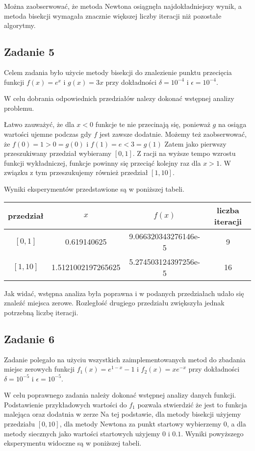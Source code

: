 \documentclass{article}
\begin{document}
Można zaobserwować, że metoda Newtona osiągnęła najdokładniejszy wynik, a metoda bisekcji wymagała znacznie większej liczby iteracji niż pozostałe algorytmy.

\subsection{Zadanie 5}

Celem zadania było użycie metody bisekcji do znalezienie punktu przecięcia funkcji $f(x) = e^x$ i $g(x) = 3x$ przy dokładności $\delta = 10^{-4}$ i $\epsilon = 10^{-4}$.

W celu dobrania odpowiednich przedziałów nalezy dokonać wstępnej analizy problemu.

Łatwo zauważyć, że dla $x < 0$ funkcje te nie przecinają się, ponieważ $g$ na osiąga wartości ujemne podczas gdy $f$ jest zawsze dodatnie.
Możemy też zaobserwować, że $f(0) = 1 > 0 = g(0)$ i $f(1) = e < 3 = g(1)$
Zatem jako pierwszy przeszukiwany przedział wybieramy $[0,1]$.
Z racji na wyższe tempo wzrostu funkcji wykładniczej, funkcje powinny się przeciąć kolejny raz dla $x>1$.
W związku z tym przeszukujemy również przedział $[1,10]$.

Wyniki eksperymentów przedstawione są w poniższej tabeli.

\begin{tabular}{|c|c|c|c|}
\hline
przedział & $x$ & $f(x)$ & liczba iteracji \\
\hline
$[0,1]$ & 0.619140625 & 9.066320343276146e-5 & 9 \\
$[1,10]$ & 1.5121002197265625 & 5.274503124397256e-5 & 16 \\
\hline
\end{tabular}

Jak widać, wstępna analiza była poprawna i w podanych przedziałach udało się znaleźć miejsca zerowe.
Rozległość drugiego przedziału zwiększyła jednak potrzebną liczbę iteracji.

\subsection{Zadanie 6}

Zadanie polegało na użyciu wszystkich zaimplementowanych metod do zbadania miejsc zerowych funkcji
$
f_1(x) = e^{1-x} - 1
$
i
$
f_2(x) = xe^{-x}
$
przy dokładności $\delta = 10^{-5}$ i $\epsilon = 10^{-5}$.

W celu poprawnego zadania należy dokonać wstępnej analizy danych funkcji.
Podstawienie przykładowych wartości do $f_1$ pozwala stwierdzić że jest to funkcja malejąca oraz dodatnia w zerze
Na tej podstawie, dla metody bisekcji użyjemy przedziału $[0,10]$, dla metody Newtona za punkt startowy wybierzemy $0$, a dla metody siecznych jako wartości startowych użyjemy $0$ i $0.1$.
Wyniki powyższego eksperymentu widoczne są w poniższej tabeli.
\end{document}
